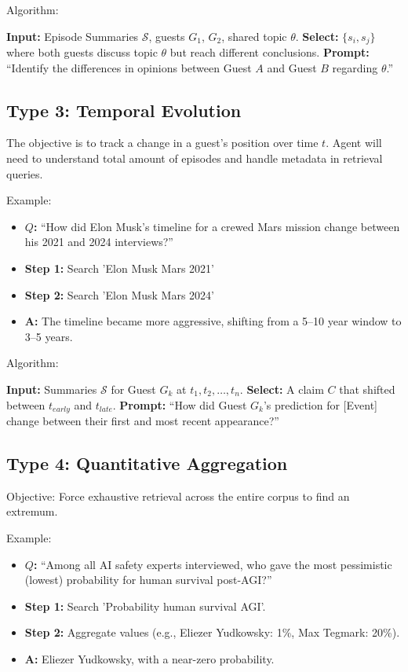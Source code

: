 \documentclass[11pt]{article}
\begin{document}
\noindent
Algorithm:
\begin{algorithmic}[1]
\State \textbf{Input:} Episode Summaries $\mathcal{S}$, guests $G_1$, $G_2$, shared topic $\theta$.
\State \textbf{Select:} $\{s_i, s_j\}$ where both guests discuss topic $\theta$ but reach different conclusions.
\State \textbf{Prompt:} ``Identify the differences in opinions between Guest $A$ and Guest $B$ regarding $\theta$.''
\end{algorithmic}

\subsection*{Type 3: Temporal Evolution}
The objective is to track a change in a guest's position over time $t$. Agent will need to understand total amount of episodes and handle metadata in retrieval queries. 


\noindent
Example:
    \begin{itemize}
        \item \textbf{$Q$:} ``How did Elon Musk's timeline for a crewed Mars mission change between his 2021 and 2024 interviews?''
        \item \textbf{Step 1:} Search 'Elon Musk Mars 2021'
        \item \textbf{Step 2:} Search 'Elon Musk Mars 2024'
        \item \textbf{A:} The timeline became more aggressive, shifting from a 5–10 year window to 3–5 years.
    \end{itemize}

\noindent
Algorithm:
\begin{algorithmic}[1]
\State \textbf{Input:} Summaries $\mathcal{S}$ for Guest $G_k$ at $t_1, t_2, \dots, t_n$.
\State \textbf{Select:} A claim $C$ that shifted between $t_{early}$ and $t_{late}$.
\State \textbf{Prompt:} ``How did Guest $G_k$'s prediction for [Event] change between their first and most recent appearance?''
\end{algorithmic}

\subsection*{Type 4: Quantitative Aggregation}
Objective: Force exhaustive retrieval across the entire corpus to find an extremum.

\noindent
Example:
\begin{itemize}
    \item \textbf{$Q$:} ``Among all AI safety experts interviewed, who gave the most pessimistic (lowest) probability for human survival post-AGI?''
    \item \textbf{Step 1:} Search 'Probability human survival AGI'.
    \item \textbf{Step 2:} Aggregate values (e.g., Eliezer Yudkowsky: 1\%, Max Tegmark: 20\%).
    \item \textbf{A:} Eliezer Yudkowsky, with a near-zero probability.
\end{itemize}
\end{document}
